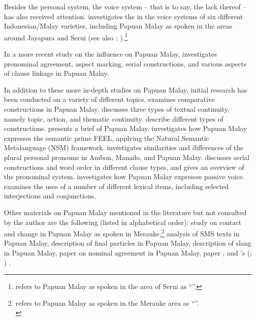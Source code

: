{Besides the personal  system, the voice system – that is to say, the lack thereof – has also received attention. {\citet{Donohue.2007}} investigates the  in the voice systems of six different Indonesian/Malay varieties, including Papuan Malay as spoken in the areas around Jayapura and Serui (see also \citealt{Donohue.2005b}; \citeyear*{Donohue.2007b}).\footnote{\citet{Donohue.2007} refers to Papuan Malay as spoken in the area of Serui as ``''.}

In a more recent study on the  influence on Papuan Malay, \citet{Donohue.2011} investigates pronominal agreement, aspect marking, serial  constructions, and various aspects of clause linkage in Papuan Malay.



In addition to these more in-depth studies on Papuan Malay, initial research has been conducted on a variety of different topics. \citet{Burung.2004} examines comparative constructions in Papuan Malay. \citet{Burung.2005} discusses three types of textual continuity, namely topic, action, and thematic continuity. \citet{Burung.2007} describe different types of  constructions. \citet{Burung.2008} presents a brief  of Papuan Malay. \citet{Burung.2008b} investigates how Papuan Malay expresses the semantic prime FEEL, applying the Natural Semantic Metalanguage (NSM) framework. {\citet{Lumi.2007}} investigates similarities and differences of the plural personal pronouns in Ambon, Manado, and Papuan Malay. {\citet{Sawaki.2004}} discusses serial  constructions and word order in different clause types, and gives an overview of the pronominal system. {\citet{Sawaki.2007}} investigates how Papuan Malay expresses passive voice. {\citet{Warami.2005}} examines the uses of a number of different lexical items, including selected interjections and conjunctions.



Other materials on Papuan Malay mentioned in the literature but not consulted by the author are the following (listed in alphabetical order):  study on contact and change in Papuan Malay as spoken in Merauke,\footnote{{\citet{Donohue.1997} refers to Papuan Malay as spoken in the Merauke area as ``''.}\\}  analysis of SMS texts in Papuan Malay,  description of final particles in Papuan Malay,  description of slang in Papuan Malay,  paper on nominal agreement in Papuan Malay,  paper , and \citeauthor{Silzer.1978}'s (\citeyear{Silzer.1978}; \citeyear{Silzer.1979}) .

}
